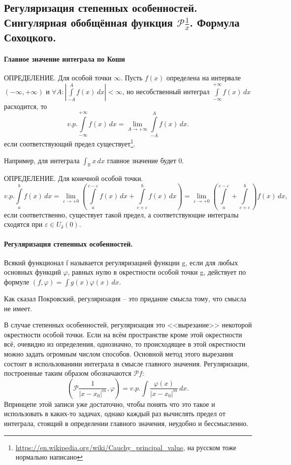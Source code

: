 \subsection{Регуляризация степенных особенностей. Сингулярная обобщённая функция $\mathcal{P} \frac{1}{x}$. Формула Сохоцкого.}

\paragraph{Главное значение интеграла по Коши}

ОПРЕДЕЛЕНИЕ. Для особой точки $\infty$. Пусть $f(x)$ определена на интервале $(-\infty, +\infty)$
и $\forall A : \left| \int\limits_{-A}^A f(x) \, dx \right| < \infty$, но несобственный интеграл 
$\int\limits_{-\infty}^{+\infty} f(x) \, dx$ расходится, то
\[
  v.p. \int\limits_{-\infty}^{+\infty} f(x) \, dx = \lim_{A \to +\infty} \int\limits_{-A}^A f(x) \, dx.
\]
если соответствующий предел существует\footnote{\url{https://en.wikipedia.org/wiki/Cauchy_principal_value}, на русском тоже нормально написано}.

Например, для интеграла $\int_{\mathbb{R}} x \, dx$ главное значение будет 0.

ОПРЕДЕЛЕНИЕ. Для конечной особой точки.
\[
  v.p. \int\limits_a^b f(x) \, dx = \lim_{\varepsilon \to +0} \left( 
    \int\limits_a^{c-\varepsilon} f(x) \, dx + \int\limits_{c+\varepsilon}^b f(x) \, dx \right)
    = \lim_{\varepsilon\to+0} \left( \int\limits_{a}^{c-\varepsilon} + \int\limits_{c+\varepsilon}^b \right) f(x) \, dx,
\]
если соответственно, существует такой предел, а соответствующие интегралы сходятся при $\varepsilon \in U_\delta (0)$.

\paragraph{Регуляризация степенных особенностей.}
Всякий функционал f называется регуляризацией функции g, если для любых основных функций $\varphi$,
равных нулю в окрестности особой точки g, действует по формуле $(f, \varphi) = \int g(x) \varphi(x) \, dx$.

Как сказал Покровский, регуляризация -- это придание смысла тому, что смысла не имеет.

В случае степенных особенностей, регуляризация это <<вырезание>> некоторой окрестности особой точки.
Если на всём пространстве кроме этой окрестности всё, очевидно из определения, однозначно, то
происходящее в этой окрестности можно задать огромным числом способов. Основной метод этого вырезания
состоит в использованиии интеграла в смысле главного значения. Регуляризации, построенные таким
образом обозначаются $\mathcal{P} f$:
\[
  \left( \mathcal{P} \dfrac{1}{|x-x_0|^m}, \varphi \right) = v.p. \int \dfrac{\varphi(x)}{|x-x_0|^m} \, dx.
\]
Впринцепе этой записи уже достаточно, чтобы понять что это такое и использовать в каких-то задачах,
однако каждый раз вычислять предел от интеграла, стоящий в определении главного значения,
неудобно и бессмысленно.


